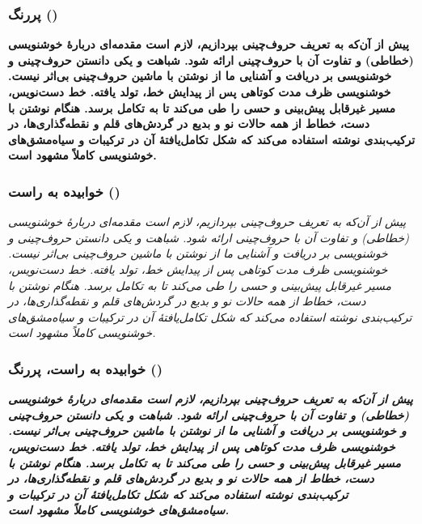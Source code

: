 \documentclass[10pt,a5paper]{article}
\theoremstyle{definition}
\theoremstyle{plain}
\begin{document}
\subsubsection{پررنگ ()}
{\bfseries
پیش از آن‌که به تعریف حروف‌چینی بپردازیم، لازم است مقدمه‌ای دربارۀ خوشنویسی (خطاطی) و تفاوت آن با حروف‌چینی ارائه شود. شباهت و یکی دانستن حروف‌چینی و خوشنویسی بر دریافت و آشنایی ما از نوشتن با ماشین حروف‌چینی بی‌اثر نیست. خوشنویسی ظرف مدت کوتاهی پس از پیدایش خط، تولد یافته. خط دست‌نویس، مسیر غیرقابل پیش‌بینی و حسی را طی می‌کند تا به تکامل برسد. هنگام نوشتن با دست، خطاط از همه حالات نو و بدیع در گردش‌های قلم و نقطه‌گذاری‌ها، در ترکیب‌بندی نوشته استفاده می‌کند که شکل تکامل‌یافتۀ آن در ترکیبات و سیاه‌مشق‌های خوشنویسی کاملاً مشهود است.
}

\subsubsection{خوابیده به راست ()}
{\itshape
پیش از آن‌که به تعریف حروف‌چینی بپردازیم، لازم است مقدمه‌ای دربارۀ خوشنویسی (خطاطی) و تفاوت آن با حروف‌چینی ارائه شود. شباهت و یکی دانستن حروف‌چینی و خوشنویسی بر دریافت و آشنایی ما از نوشتن با ماشین حروف‌چینی بی‌اثر نیست. خوشنویسی ظرف مدت کوتاهی پس از پیدایش خط، تولد یافته. خط دست‌نویس، مسیر غیرقابل پیش‌بینی و حسی را طی می‌کند تا به تکامل برسد. هنگام نوشتن با دست، خطاط از همه حالات نو و بدیع در گردش‌های قلم و نقطه‌گذاری‌ها، در ترکیب‌بندی نوشته استفاده می‌کند که شکل تکامل‌یافتۀ آن در ترکیبات و سیاه‌مشق‌های خوشنویسی کاملاً مشهود است.
}

\subsubsection{خوابیده به راست، پررنگ ()}
{\bfseries\itshape
پیش از آن‌که به تعریف حروف‌چینی بپردازیم، لازم است مقدمه‌ای دربارۀ خوشنویسی (خطاطی) و تفاوت آن با حروف‌چینی ارائه شود. شباهت و یکی دانستن حروف‌چینی و خوشنویسی بر دریافت و آشنایی ما از نوشتن با ماشین حروف‌چینی بی‌اثر نیست. خوشنویسی ظرف مدت کوتاهی پس از پیدایش خط، تولد یافته. خط دست‌نویس، مسیر غیرقابل پیش‌بینی و حسی را طی می‌کند تا به تکامل برسد. هنگام نوشتن با دست، خطاط از همه حالات نو و بدیع در گردش‌های قلم و نقطه‌گذاری‌ها، در ترکیب‌بندی نوشته استفاده می‌کند که شکل تکامل‌یافتۀ آن در ترکیبات و سیاه‌مشق‌های خوشنویسی کاملاً مشهود است.
}
\end{document}
